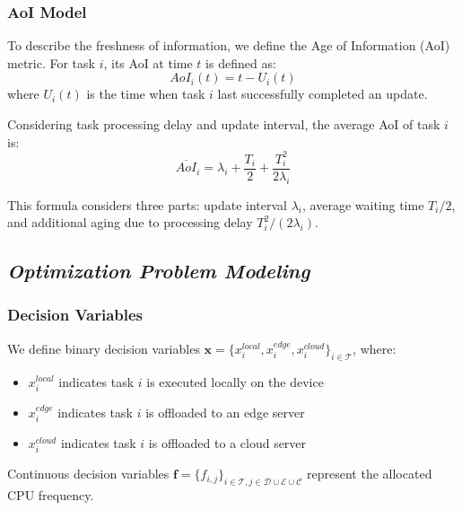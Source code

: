 \documentclass[conference]{IEEEtran}
\begin{document}
\subsubsection{AoI Model}
To describe the freshness of information, we define the Age of Information (AoI) metric. For task $i$, its AoI at time $t$ is defined as:
\begin{equation}
AoI_i(t) = t - U_i(t)
\end{equation}
where $U_i(t)$ is the time when task $i$ last successfully completed an update.

Considering task processing delay and update interval, the average AoI of task $i$ is:
\begin{equation}
\overline{AoI}_i = \lambda_i + \frac{T_i}{2} + \frac{T_i^2}{2\lambda_i}
\end{equation}

This formula considers three parts: update interval $\lambda_i$, average waiting time $T_i/2$, and additional aging due to processing delay $T_i^2/(2\lambda_i)$.

\subsection{\textit{Optimization Problem Modeling}}
\subsubsection{Decision Variables}
We define binary decision variables $\mathbf{x} = \{x_i^{local}, x_i^{edge}, x_i^{cloud}\}_{i \in \mathcal{T}}$, where:
\begin{itemize}
    \item $x_{i}^{local}$ indicates task $i$ is executed locally on the device
    \item $x_{i}^{edge}$ indicates task $i$ is offloaded to an edge server
    \item $x_{i}^{cloud}$ indicates task $i$ is offloaded to a cloud server
\end{itemize}
Continuous decision variables $\mathbf{f} = \{f_{i,j}\}_{i \in \mathcal{T}, j \in \mathcal{D} \cup \mathcal{E} \cup \mathcal{C}}$ represent the allocated CPU frequency.
\end{document}
